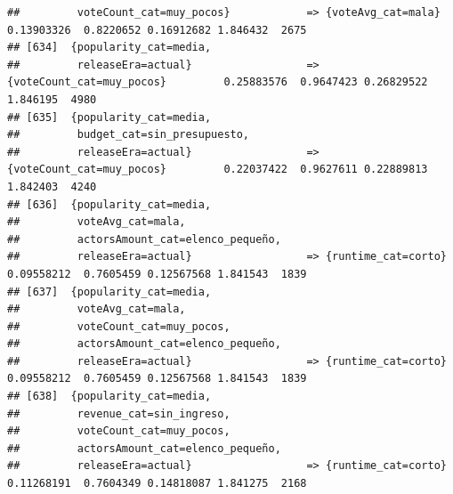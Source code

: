 \documentclass[
]{article}
\begin{document}
\begin{verbatim}
##         voteCount_cat=muy_pocos}            => {voteAvg_cat=mala}                0.13903326  0.8220652 0.16912682 1.846432  2675
## [634]  {popularity_cat=media,                                                                                                   
##         releaseEra=actual}                  => {voteCount_cat=muy_pocos}         0.25883576  0.9647423 0.26829522 1.846195  4980
## [635]  {popularity_cat=media,                                                                                                   
##         budget_cat=sin_presupuesto,                                                                                             
##         releaseEra=actual}                  => {voteCount_cat=muy_pocos}         0.22037422  0.9627611 0.22889813 1.842403  4240
## [636]  {popularity_cat=media,                                                                                                   
##         voteAvg_cat=mala,                                                                                                       
##         actorsAmount_cat=elenco_pequeño,                                                                                        
##         releaseEra=actual}                  => {runtime_cat=corto}               0.09558212  0.7605459 0.12567568 1.841543  1839
## [637]  {popularity_cat=media,                                                                                                   
##         voteAvg_cat=mala,                                                                                                       
##         voteCount_cat=muy_pocos,                                                                                                
##         actorsAmount_cat=elenco_pequeño,                                                                                        
##         releaseEra=actual}                  => {runtime_cat=corto}               0.09558212  0.7605459 0.12567568 1.841543  1839
## [638]  {popularity_cat=media,                                                                                                   
##         revenue_cat=sin_ingreso,                                                                                                
##         voteCount_cat=muy_pocos,                                                                                                
##         actorsAmount_cat=elenco_pequeño,                                                                                        
##         releaseEra=actual}                  => {runtime_cat=corto}               0.11268191  0.7604349 0.14818087 1.841275  2168

\end{verbatim}
\end{document}

